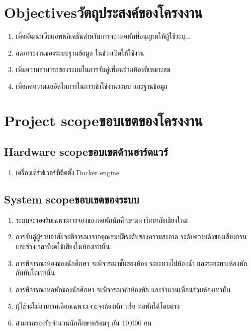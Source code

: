 \section{\ifenglish Objectives\else วัตถุประสงค์ของโครงงาน\fi}
\begin{enumerate}
    \item เพื่อพัฒนาเว็บแอพพลิเคชันสำหรับการจองหอพักที่อนุญาตให้ผู้ใช้ระบุ...
    \item ลดภาระงานของระบบฐานข้อมูล ในช่วงเปิดให้ใช้งาน
    \item เพิ่มความสามารถของระบบในการจับคู่เพื่อนร่วมห้องที่เหมาะสม
    \item เพื่อลดความแออัดในการในการเข้าใช้งานระบบ และฐานข้อมูล
\end{enumerate}

\section{\ifenglish Project scope\else ขอบเขตของโครงงาน\fi}
\subsection{\ifenglish Hardware scope\else ขอบเขตด้านฮาร์ดแวร์\fi}
\begin{enumerate}
    \item เครื่องเซิร์ฟเวอร์ที่ติดตั้ง Docker engine
\end{enumerate}
\subsection{\ifenglish System scope\else ขอบเขตของระบบ\fi}
\begin{enumerate}
    \item ระบบจะรองรับเฉพาะการจองของหอพักนักศึกษามหาวิทยาลัยเชียงใหม่
    \item การจับคู่ผู้ร่วมอาศัยจะพิจารณาจากคุณสมบัติระดับของความสะอาด
          ระดับความดังของเสียงกรน และช่วงเวลาที่งดใช้เสียงในห้องเท่านั้น
    \item การพิจารณาห้องของนักศึกษา จะพิจารณาชั้นของห้อง ระยะทางไปห้องน้ำ และระยะทางห้องพักกับบันไดเท่านั้น
    \item การพิจารณาหอพักของนักศึกษา จะพิจารณาค่าห้องพัก และจำนวนเพื่อนร่วมห้องเท่านั้น
    \item ผู้ใช้จะไม่สามารถเลือกเฉพาะเจาะจงห้องพัก หรือ หอพักได้โดยตรง
    \item สามารถรองรับจำนวนนักศึกษาพร้อมๆ กัน 10,000 คน
\end{enumerate}

